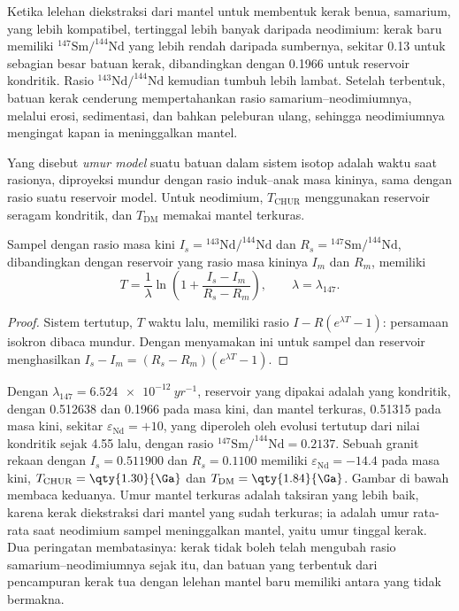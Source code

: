 Ketika lelehan diekstraksi dari mantel untuk membentuk kerak benua, samarium,
yang lebih kompatibel, tertinggal lebih banyak daripada neodimium: kerak baru memiliki
$^{147}\mathrm{Sm}/^{144}\mathrm{Nd}$ yang lebih rendah daripada sumbernya, sekitar 0.13 untuk sebagian besar
batuan kerak, dibandingkan dengan 0.1966 untuk reservoir kondritik. Rasio
$^{143}\mathrm{Nd}/^{144}\mathrm{Nd}$ kemudian tumbuh lebih lambat.
Setelah terbentuk, batuan kerak cenderung mempertahankan rasio samarium--neodimiumnya,
melalui erosi, sedimentasi, dan bahkan peleburan ulang, sehingga neodimiumnya mengingat kapan ia meninggalkan
mantel.

\begin{definition}\label{def:b3:advanced-geochronology:model-age}
Yang disebut \emph{umur model} suatu batuan dalam sistem isotop adalah
waktu saat rasionya, diproyeksi mundur dengan rasio induk--anak masa kininya,
sama dengan rasio suatu reservoir model. Untuk neodimium, $T_{\mathrm{CHUR}}$
menggunakan reservoir seragam kondritik, dan $T_{\mathrm{DM}}$ memakai mantel
terkuras.
\end{definition}

\begin{theorem}\label{thm:b3:advanced-geochronology:model-age}
Sampel dengan rasio masa kini $I_s = {}^{143}\mathrm{Nd}/^{144}\mathrm{Nd}$ dan
$R_s = {}^{147}\mathrm{Sm}/^{144}\mathrm{Nd}$, dibandingkan dengan reservoir yang
rasio masa kininya $I_m$ dan $R_m$, memiliki 
\[
T = \frac1\lambda\ln\left(1 + \frac{I_s - I_m}{R_s - R_m}\right),
\qquad \lambda = \lambda_{147}.
\]
\end{theorem}

\begin{proof}
Sistem tertutup, $T$ waktu lalu, memiliki rasio $I - R(e^{\lambda T} - 1)$: persamaan
isokron dibaca mundur. Dengan menyamakan ini untuk sampel dan
reservoir menghasilkan $I_s - I_m = (R_s - R_m)(e^{\lambda T} - 1)$.
\end{proof}

Dengan $\lambda_{147} = \qty{6.524e-12}{yr^{-1}}$, reservoir yang dipakai adalah
yang kondritik, dengan 0.512638 dan 0.1966 pada masa kini, dan mantel terkuras,
0.51315 pada masa kini, sekitar $\varepsilon_{\mathrm{Nd}} = +10$, yang diperoleh
oleh evolusi tertutup dari nilai kondritik sejak \qty{4.55}{\Ga} lalu, dengan rasio
$^{147}\mathrm{Sm}/^{144}\mathrm{Nd} = 0.2137$. Sebuah granit rekaan dengan
$I_s = 0.511900$ dan $R_s = 0.1100$ memiliki $\varepsilon_{\mathrm{Nd}} = -14.4$
pada masa kini, $T_{\mathrm{CHUR}} = \qty{1.30}{\Ga}$ dan $T_{\mathrm{DM}} =
\qty{1.84}{\Ga}$. Gambar di bawah membaca keduanya. Umur mantel terkuras adalah
taksiran yang lebih baik, karena kerak diekstraksi dari mantel yang sudah
terkuras; ia adalah umur rata-rata saat neodimium sampel meninggalkan
mantel, yaitu umur tinggal kerak. Dua peringatan membatasinya: kerak tidak boleh
telah mengubah rasio samarium--neodimiumnya sejak itu, dan batuan yang terbentuk dari pencampuran
kerak tua dengan lelehan mantel baru memiliki  antara yang tidak bermakna.


